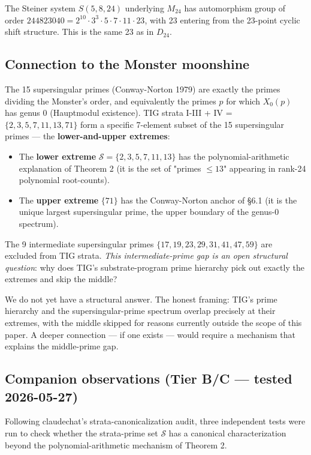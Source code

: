 \documentclass[11pt,reqno]{amsart}
\theoremstyle{plain}
\theoremstyle{definition}
\begin{document}
The Steiner system $S(5, 8, 24)$ underlying $M_{24}$ has automorphism group of order $244823040 = 2^{10} \cdot 3^3 \cdot 5 \cdot 7 \cdot 11 \cdot 23$, with 23 entering from the 23-point cyclic shift structure. This is the same 23 as in $D_{24}$.

\subsection{Connection to the Monster moonshine}

The 15 supersingular primes (Conway-Norton 1979) are exactly the primes dividing the Monster's order, and equivalently the primes $p$ for which $X_0(p)$ has genus 0 (Hauptmodul existence). TIG strata I-III + IV = $\{2, 3, 5, 7, 11, 13, 71\}$ form a specific 7-element subset of the 15 supersingular primes --- the \textbf{lower-and-upper extremes}:

\begin{itemize}
\item The \textbf{lower extreme} $\mathcal{S} = \{2, 3, 5, 7, 11, 13\}$ has the polynomial-arithmetic explanation of Theorem 2 (it is the set of "primes $\leq 13$" appearing in rank-24 polynomial root-counts).
\item The \textbf{upper extreme} $\{71\}$ has the Conway-Norton anchor of §6.1 (it is the unique largest supersingular prime, the upper boundary of the genus-0 spectrum).
\end{itemize}

The 9 intermediate supersingular primes $\{17, 19, 23, 29, 31, 41, 47, 59\}$ are excluded from TIG strata. \textit{This intermediate-prime gap is an open structural question}: why does TIG's substrate-program prime hierarchy pick out exactly the extremes and skip the middle?

We do not yet have a structural answer. The honest framing: TIG's prime hierarchy and the supersingular-prime spectrum overlap precisely at their extremes, with the middle skipped for reasons currently outside the scope of this paper. A deeper connection --- if one exists --- would require a mechanism that explains the middle-prime gap.

\subsection{Companion observations (Tier B/C --- tested 2026-05-27)}

Following claudechat's strata-canonicalization audit, three independent tests were run to check whether the strata-prime set $\mathcal{S}$ has a canonical characterization beyond the polynomial-arithmetic mechanism of Theorem 2.
\end{document}
